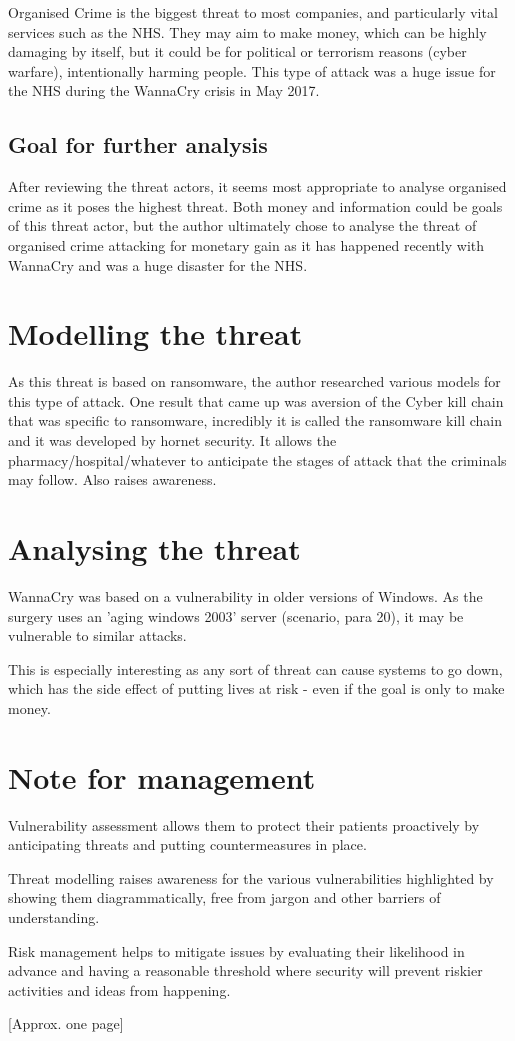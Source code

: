 \documentclass[12pt,a4paper]{article}
\begin{document}
Organised Crime is the biggest threat to most companies, and particularly vital services such as the NHS. They may aim to make money, which can be highly damaging by itself, but it could be for political or terrorism reasons (cyber warfare), intentionally harming people. This type of attack was a huge issue for the NHS during the WannaCry crisis in May 2017.

\subsection{Goal for further analysis}
After reviewing the threat actors, it seems most appropriate to analyse organised crime as it poses the highest threat. Both money and information could be goals of this threat actor, but the author ultimately chose to analyse the threat of organised crime attacking for monetary gain as it has happened recently with WannaCry and was a huge disaster for the NHS.

\section{Modelling the threat}
As this threat is based on ransomware, the author researched various models for this type of attack. One result that came up was  aversion of the Cyber kill chain that was specific to ransomware, incredibly it is called the ransomware kill chain and it was developed by hornet security. It allows the pharmacy/hospital/whatever to anticipate the stages of attack that the criminals may follow. Also raises awareness. 

\section{Analysing the threat}
WannaCry was based on a vulnerability in older versions of Windows. As the surgery uses an 'aging windows 2003' server (scenario, para 20), it may be vulnerable to similar attacks.

This is especially interesting as any sort of threat can cause systems to go down, which has the side effect of putting lives at risk - even if the goal is only to make money.
\section{Note for management}
Vulnerability assessment allows them to protect their patients proactively by anticipating threats and putting countermeasures in place. 

Threat modelling raises awareness for the various vulnerabilities highlighted by showing them diagrammatically, free from jargon and other barriers of understanding. 

Risk management helps to mitigate issues by evaluating their likelihood in advance and having a reasonable threshold where security will prevent riskier activities and ideas from happening.

[Approx. one page]



\end{document}
